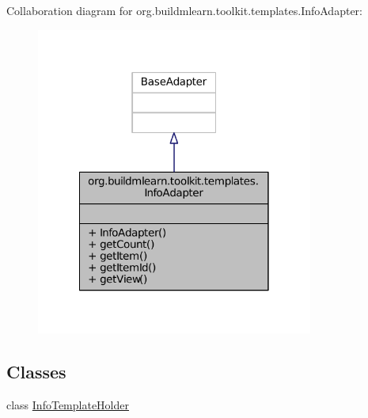Collaboration diagram for org.\-buildmlearn.\-toolkit.\-templates.\-Info\-Adapter\-:
\nopagebreak
\begin{figure}[H]
\begin{center}
\leavevmode
\includegraphics[width=258pt]{d0/dcc/classorg_1_1buildmlearn_1_1toolkit_1_1templates_1_1InfoAdapter__coll__graph}
\end{center}
\end{figure}
\subsection*{Classes}
\begin{DoxyCompactItemize}
\item 
class \hyperlink{classorg_1_1buildmlearn_1_1toolkit_1_1templates_1_1InfoAdapter_1_1InfoTemplateHolder}{Info\-Template\-Holder}
\end{DoxyCompactItemize}
